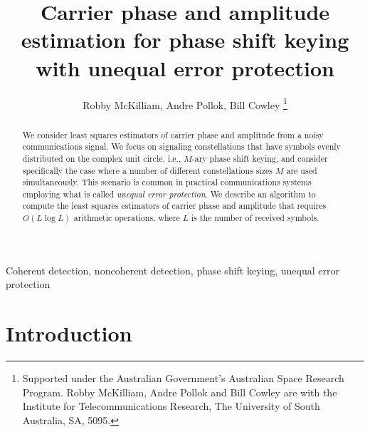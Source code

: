 \documentclass[journal]{IEEEtran}
\title{Carrier phase and amplitude estimation for phase shift keying with unequal error protection}
\author{Robby McKilliam, Andre Pollok, Bill Cowley
\thanks{
Supported under the Australian Government’s Australian Space Research Program.
Robby McKilliam, Andre Pollok and Bill Cowley are with the Institute for Telecommunications Research, The University of South Australia, SA, 5095.}}
\begin{document}
\maketitle

\begin{abstract}
We consider least squares estimators of carrier phase and amplitude from a noisy communications signal.  We focus on signaling constellations that have symbols evenly distributed on the complex unit circle, i.e., $M$-ary phase shift keying, and consider specifically the case where a number of different constellations sizes $M$ are used simultaneously.  This scenario is common in practical communications systems employing what is called \emph{unequal error protection}.  We describe an algorithm to compute the least squares estimators of carrier phase and amplitude that requires $O(L \log L)$ arithmetic operations, where $L$ is the number of received symbols.   
\end{abstract}
\begin{IEEEkeywords}
Coherent detection, noncoherent detection, phase shift keying, unequal error protection
\end{IEEEkeywords}

\section{Introduction}
\end{document}
